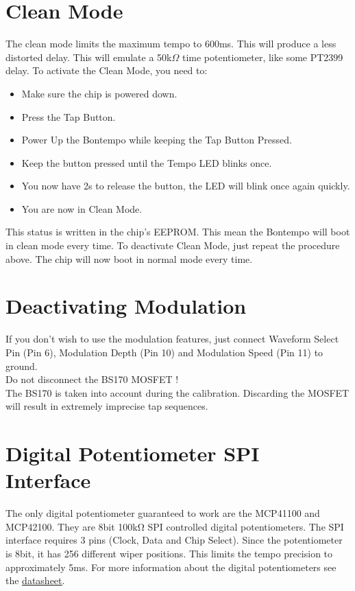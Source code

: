 \documentclass[a4paper, 10pt]{article}
\begin{document}
\section{Clean Mode}
\label{sec:cleanmode}
\bigbreak
The clean mode limits the maximum tempo to 600ms. This will produce a less distorted delay. This will emulate a 50k$\Omega$ time potentiometer, like some PT2399 delay.
\bigbreak
To activate the Clean Mode, you need to:
\begin{itemize}
\item Make sure the chip is powered down.
\item Press the Tap Button.
\item Power Up the Bontempo while keeping the Tap Button Pressed.
\item Keep the button pressed until the Tempo LED blinks once.
\item You now have 2s to release the button, the LED will blink   once again quickly.
\item You are now in Clean Mode.
\end{itemize}
\bigbreak
This status is written in the chip's EEPROM. This mean the Bontempo will boot in clean mode every time.
To deactivate Clean Mode, just repeat the procedure above. The chip will now boot in normal mode every time.\\

\section{Deactivating Modulation}
\bigbreak
If you don’t wish to use the modulation features, just connect Waveform Select Pin (Pin 6), Modulation Depth (Pin 10) and Modulation Speed (Pin 11) to ground.\\

Do not disconnect the BS170 MOSFET !\\

The BS170 is taken into account during the calibration. Discarding the MOSFET will result in extremely imprecise tap sequences.\\
\newpage
\section{Digital Potentiometer SPI Interface}
\label{sec:digpot}
\bigbreak
The only digital potentiometer guaranteed to work are the MCP41100 and MCP42100. They are 8bit 100kΩ SPI controlled digital potentiometers. The SPI interface requires 3 pins (Clock, Data and Chip Select). Since the potentiometer is 8bit, it has 256 different wiper positions. This limits the tempo precision to approximately 5ms. For more information about the digital potentiometers see the \href{http://ww1.microchip.com/downloads/en/DeviceDoc/11195c.pdf}{\underline{datasheet}}.\\
\end{document}
